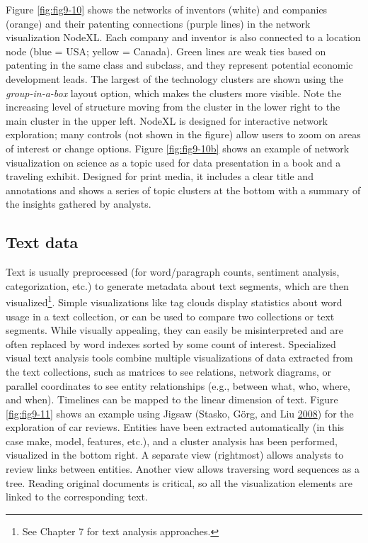 \documentclass[]{krantz}
\begin{document}
Figure \ref{fig:fig9-10} shows the networks of inventors (white) and
companies (orange) and their patenting connections (purple lines) in the
network visualization NodeXL. Each company and inventor is also
connected to a location node (blue = USA; yellow = Canada). Green lines
are weak ties based on patenting in the same class and subclass, and
they represent potential economic development leads. The largest of the
technology clusters are shown using the \emph{group-in-a-box} layout
option, which makes the clusters more visible. Note the increasing level
of structure moving from the cluster in the lower right to the main
cluster in the upper left. NodeXL is designed for interactive network
exploration; many controls (not shown in the figure) allow users to zoom
on areas of interest or change options. Figure \ref{fig:fig9-10b} shows
an example of network visualization on science as a topic used for data
presentation in a book and a traveling exhibit. Designed for print
media, it includes a clear title and annotations and shows a series of
topic clusters at the bottom with a summary of the insights gathered by
analysts.

\subsection{Text data}\label{sec:viz-2.7}

Text is usually preprocessed (for word/paragraph counts, sentiment
analysis, categorization, etc.) to generate metadata about text
segments, which are then visualized\footnote{See Chapter 7 for text
  analysis approaches.}. Simple visualizations like tag clouds display
statistics about word usage in a text collection, or can be used to
compare two collections or text segments. While visually appealing, they
can easily be misinterpreted and are often replaced by word indexes
sorted by some count of interest. Specialized visual text analysis tools
combine multiple visualizations of data extracted from the text
collections, such as matrices to see relations, network diagrams, or
parallel coordinates to see entity relationships (e.g., between what,
who, where, and when). Timelines can be mapped to the linear dimension
of text. Figure \ref{fig:fig9-11} shows an example using Jigsaw (Stasko,
Görg, and Liu \protect\hyperlink{ref-stasko2008jigsaw}{2008}) for the
exploration of car reviews. Entities have been extracted automatically
(in this case make, model, features, etc.), and a cluster analysis has
been performed, visualized in the bottom right. A separate view
(rightmost) allows analysts to review links between entities. Another
view allows traversing word sequences as a tree. Reading original
documents is critical, so all the visualization elements are linked to
the corresponding text.
\end{document}

